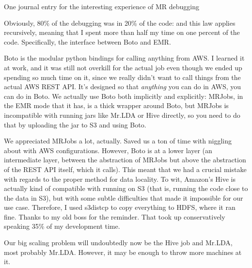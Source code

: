 One journal entry for the interesting experience of MR debugging

Obviously, 80\% of the debugging was in 20\% of the code: and this law applies recursively, meaning that I spent more than half my time on one percent of the code. Specifically, the interface between Boto and EMR.

Boto is the modular python bindings for calling anything from AWS. I learned it at work, and it was still not overkill for the actual job even though we ended up spending so much time on it, since we really didn't want to call things from the actual AWS REST API. It's designed so that \emph{anything} you can do in AWS, you can do in Boto. We actually use Boto both implicitly and explicitly: MRJobs, in the EMR mode that it has, is a thick wrapper around Boto, but MRJobs is incompatible with running jars like Mr.LDA or Hive directly, so you need to do that by uploading the jar to S3 and using Boto.

We appreciated MRJobs a lot, actually. Saved us a ton of time with niggling about with AWS configurations. However, Boto is at a lower layer (an intermediate layer, between the abstraction of MRJobs but above the abstraction of the REST API itself, which it calls). This meant that we had a crucial mistake with regards to the proper method for data locality. To wit, Amazon's Hive is actually kind of compatible with running on S3 (that is, running the code close to the data in S3), but with some subtle difficulties that made it impossible for our use case. Therefore, I used s3distcp to copy everything to HDFS, where it ran fine. Thanks to my old boss for the reminder. That took up conservatively speaking 35\% of my development time.

Our big scaling problem will undoubtedly now be the Hive job and Mr.LDA, most probably Mr.LDA. However, it may be enough to throw more machines at it.

